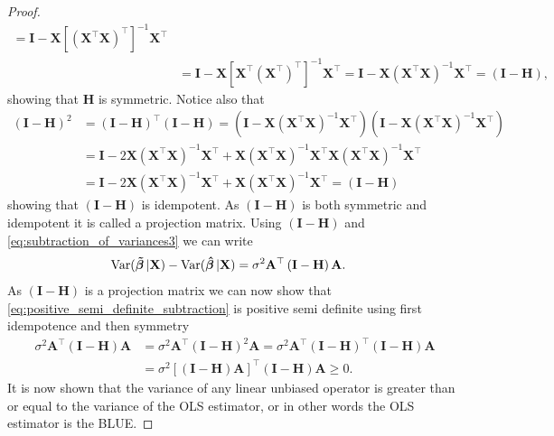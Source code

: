 \begin{proof}
\begin{align*}
        = \mathbf{I} - \mathbf{X}\left[(\mathbf{X}^\top\mathbf{X})^\top\right]^{-1}\mathbf{X}^\top \\
        &= \mathbf{I} - \mathbf{X}\left[\mathbf{X}^\top\left(\mathbf{X}^\top\right)^\top\right]^{-1}\mathbf{X}^\top 
        = \mathbf{I} - \mathbf{X}\left(\mathbf{X}^\top\mathbf{X}\right)^{-1}\mathbf{X}^\top = \left(\mathbf{I} - \mathbf{H}\right),
    \end{align*}
    showing that $\mathbf{H}$ is symmetric.
    Notice also that
    \begin{align*}
        \left(\mathbf{I} - \mathbf{H}\right)^2 &= \left(\mathbf{I} - \mathbf{H}\right)^\top\left(\mathbf{I} - \mathbf{H}\right) = (\mathbf{I} - \mathbf{X}\left(\mathbf{X}^\top\mathbf{X}\right)^{-1}\mathbf{X}^\top)(\mathbf{I} - \mathbf{X}\left(\mathbf{X}^\top\mathbf{X}\right)^{-1}\mathbf{X}^\top) \\
        &= \mathbf{I} - 2\mathbf{X}\left(\mathbf{X}^\top\mathbf{X}\right)^{-1}\mathbf{X}^\top + \mathbf{X}\left(\mathbf{X}^\top\mathbf{X}\right)^{-1}\mathbf{X}^\top\mathbf{X}\left(\mathbf{X}^\top\mathbf{X}\right)^{-1}\mathbf{X}^\top \\
        &= \mathbf{I} - 2\mathbf{X}\left(\mathbf{X}^\top\mathbf{X}\right)^{-1}\mathbf{X}^\top + \mathbf{X}\left(\mathbf{X}^\top\mathbf{X}\right)^{-1}\mathbf{X}^\top = \left(\mathbf{I} - \mathbf{H}\right)
    \end{align*}
    showing that $\left(\mathbf{I} - \mathbf{H}\right)$ is idempotent.
    As $\left(\mathbf{I} - \mathbf{H}\right)$ is both symmetric and idempotent it is called a projection matrix.
    Using $\left(\mathbf{I} - \mathbf{H}\right)$ and \eqref{eq:subtraction_of_variances3} we can write
    \begin{align}\label{eq:positive_semi_definite_subtraction}
        \operatorname{\text{Var}}(\operatorname{\boldsymbol{\Tilde{\beta}}}|\mathbf{X}) - \operatorname{\text{Var}}(\operatorname{\boldsymbol{\hat{\beta}}}|\mathbf{X}) &= \sigma^2\mathbf{A}^\top\left(\mathbf{I} - \mathbf{H}\right)\mathbf{A}.
    \end{align}
    As $\left(\mathbf{I} - \mathbf{H}\right)$ is a projection matrix we can now show that \eqref{eq:positive_semi_definite_subtraction} is positive semi definite using first idempotence and then symmetry
    \begin{align*}
        \sigma^2\mathbf{A}^\top\left(\mathbf{I} - \mathbf{H}\right)\mathbf{A} &= \sigma^2\mathbf{A}^\top\left(\mathbf{I} - \mathbf{H}\right)^2\mathbf{A} = \sigma^2\mathbf{A}^\top\left(\mathbf{I} - \mathbf{H}\right)^\top\left(\mathbf{I} - \mathbf{H}\right)\mathbf{A}\\
        &= \sigma^2\left[\left(\mathbf{I} - \mathbf{H}\right)\mathbf{A}\right]^\top\left(\mathbf{I} - \mathbf{H}\right)\mathbf{A} \geq 0.
    \end{align*}
    It is now shown that the variance of any linear unbiased operator is greater than or equal to the variance of the OLS estimator, or in other words the OLS estimator is the BLUE.
\end{proof}

